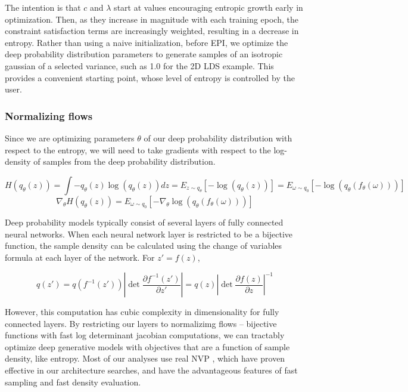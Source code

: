 \documentclass[11pt]{article}
\begin{document}
The intention is that $c$ and $\lambda$ start at values encouraging entropic growth early in optimization.  Then, as they increase in magnitude with each training epoch, the constraint satisfaction terms are increasingly weighted, resulting in a decrease in entropy.  Rather than using a naive initialization, before EPI, we optimize the deep probability distribution parameters to generate samples of an isotropic gaussian of a selected variance, such as 1.0 for the 2D LDS example.  This provides a convenient starting point, whose level of entropy is controlled by the user.

\subsubsection{Normalizing flows}\label{methods_NF}
Since we are optimizing parameters $\theta$ of our deep probability distribution with respect to the entropy, we will need to take gradients with respect to the log-density of samples from the deep probability distribution.

\begin{equation}
H(q_\theta(z)) = \int - q_\theta(z) \log(q_\theta(z)) dz = E_{z \sim q_\theta}\left[-\log(q_\theta(z)) \right] = E_{\omega \sim q_0}\left[-\log(q_\theta(f_\theta(\omega))) \right]
\end{equation}
\begin{equation}
\nabla_\theta H(q_\theta(z)) = E_{\omega \sim q_0}\left[- \nabla_\theta \log(q_\theta(f_\theta(\omega))) \right]
\end{equation}

Deep probability models typically consist of several layers of fully connected neural networks.  When each neural network layer is restricted to be a bijective function, the sample density can be calculated using the change of variables formula at each layer of the network.  For $z' = f(z)$,

\begin{equation}
q(z') = q(f^{-1}(z')) \left| \det \frac{\partial f^{-1}(z')}{\partial z'} \right| = q(z) \left| \det \frac{\partial f(z)}{\partial z} \right|^{-1}
\end{equation}

However, this computation has cubic complexity in dimensionality for fully connected layers.  By restricting our layers to normalizimg flows \cite{rezende2015variational} -- bijective functions with fast log determinant jacobian computations, we can tractably optimize deep generative models with objectives that are a function of sample density, like entropy. Most of our analyses use real NVP \cite{dinh2017density}, which have proven effective in our architecture searches, and have the advantageous features of fast sampling and fast density evaluation.
\end{document}

